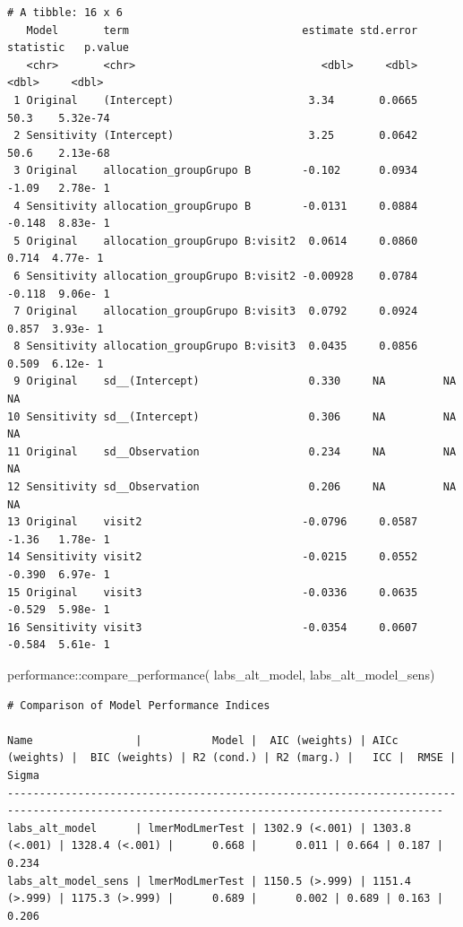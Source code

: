 \documentclass[
  12pt,
]{article}
\newenvironment{Shaded}{\begin{snugshade}}{\end{snugshade}}
\newcommand{\FunctionTok}[1]{\textcolor[rgb]{0.28,0.35,0.67}{#1}}
\newcommand{\NormalTok}[1]{\textcolor[rgb]{0.00,0.23,0.31}{#1}}
\newcommand{\SpecialCharTok}[1]{\textcolor[rgb]{0.37,0.37,0.37}{#1}}
\begin{document}
\begin{verbatim}
# A tibble: 16 x 6
   Model       term                           estimate std.error statistic   p.value
   <chr>       <chr>                             <dbl>     <dbl>     <dbl>     <dbl>
 1 Original    (Intercept)                     3.34       0.0665    50.3    5.32e-74
 2 Sensitivity (Intercept)                     3.25       0.0642    50.6    2.13e-68
 3 Original    allocation_groupGrupo B        -0.102      0.0934    -1.09   2.78e- 1
 4 Sensitivity allocation_groupGrupo B        -0.0131     0.0884    -0.148  8.83e- 1
 5 Original    allocation_groupGrupo B:visit2  0.0614     0.0860     0.714  4.77e- 1
 6 Sensitivity allocation_groupGrupo B:visit2 -0.00928    0.0784    -0.118  9.06e- 1
 7 Original    allocation_groupGrupo B:visit3  0.0792     0.0924     0.857  3.93e- 1
 8 Sensitivity allocation_groupGrupo B:visit3  0.0435     0.0856     0.509  6.12e- 1
 9 Original    sd__(Intercept)                 0.330     NA         NA     NA       
10 Sensitivity sd__(Intercept)                 0.306     NA         NA     NA       
11 Original    sd__Observation                 0.234     NA         NA     NA       
12 Sensitivity sd__Observation                 0.206     NA         NA     NA       
13 Original    visit2                         -0.0796     0.0587    -1.36   1.78e- 1
14 Sensitivity visit2                         -0.0215     0.0552    -0.390  6.97e- 1
15 Original    visit3                         -0.0336     0.0635    -0.529  5.98e- 1
16 Sensitivity visit3                         -0.0354     0.0607    -0.584  5.61e- 1
\end{verbatim}

\begin{Shaded}
\begin{Highlighting}[]
\NormalTok{performance}\SpecialCharTok{::}\FunctionTok{compare\_performance}\NormalTok{(}
\NormalTok{    labs\_alt\_model, }
\NormalTok{    labs\_alt\_model\_sens)}
\end{Highlighting}
\end{Shaded}

\begin{verbatim}
# Comparison of Model Performance Indices

Name                |           Model |  AIC (weights) | AICc (weights) |  BIC (weights) | R2 (cond.) | R2 (marg.) |   ICC |  RMSE | Sigma
------------------------------------------------------------------------------------------------------------------------------------------
labs_alt_model      | lmerModLmerTest | 1302.9 (<.001) | 1303.8 (<.001) | 1328.4 (<.001) |      0.668 |      0.011 | 0.664 | 0.187 | 0.234
labs_alt_model_sens | lmerModLmerTest | 1150.5 (>.999) | 1151.4 (>.999) | 1175.3 (>.999) |      0.689 |      0.002 | 0.689 | 0.163 | 0.206
\end{verbatim}
\end{document}
